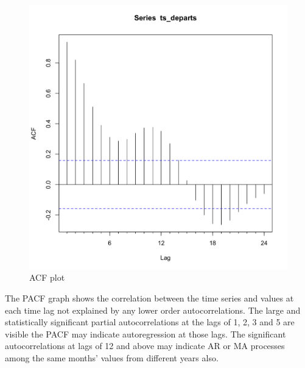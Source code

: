 \documentclass[9pt,technote]{IEEEtran}
\begin{document}
\begin{figure}[htbp]
\centerline{\includegraphics[scale=0.25]{Acf.png}}
\caption{ACF plot}
\label{fig:Acf}
\end{figure}

The PACF graph shows the correlation between the time series and values at each time lag not explained by any lower order autocorrelations.  The large and statistically significant partial autocorrelations at the lags of 1, 2, 3 and 5 are visible the PACF may indicate autoregression at those lags.  The significant autocorrelations at lags of 12 and above may indicate AR or MA processes among the same months' values from different years also.  
\end{document}
